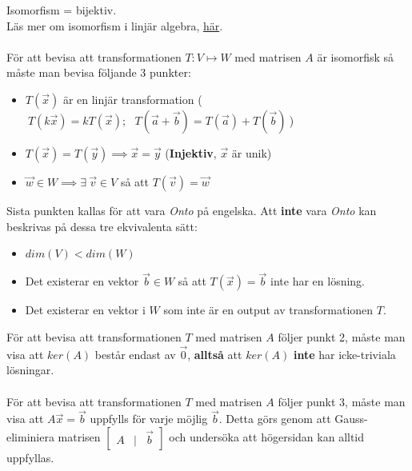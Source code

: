 \documentclass{report}
\begin{document}
{
	Isomorfism = bijektiv.\\
	Läs mer om isomorfism i linjär algebra, \href{https://math.libretexts.org/Bookshelves/Linear_Algebra/A_First_Course_in_Linear_Algebra_(Kuttler)/05\%3A_Linear_Transformations/5.06\%3A_Isomorphisms}{här}.
	\\\\
	
	För att bevisa att transformationen $T: V \mapsto W$ med matrisen $A$ är isomorfisk så måste man bevisa följande 3 punkter:
	\begin{itemize}
		\item $T(\vec{x})$ är en linjär transformation ($\:T(k\vec{x}) = kT(\vec{x}); \:\:\: T(\vec{a} + \vec{b}) = T(\vec{a}) + T(\vec{b})\:$)
		\item $T(\vec{x}) = T(\vec{y}) \implies \vec{x} = \vec{y}$ (\textbf{Injektiv}, $\vec{x}$ är unik)
		\item $\vec{w} \in W \implies \exists \: \vec{v} \in V$ så att $T(\vec{v}) = \vec{w}$
	\end{itemize}
	Sista punkten kallas för att vara \textit{Onto} på engelska. Att \textbf{inte} vara \textit{Onto} kan beskrivas på dessa tre ekvivalenta sätt:
	\begin{itemize}
		\item $dim(V) < dim(W)$
		\item Det existerar en vektor $\vec{b} \in W$ så att $T(\vec{x}) = \vec{b}$ inte har en lösning.
		\item Det existerar en vektor i $W$ som inte är en output av transformationen $T$. 
	\end{itemize}
	För att bevisa att transformationen $T$ med matrisen $A$ följer punkt 2, måste man visa att $ker(A)$ består endast av $\vec{0}$, \textbf{alltså} att $ker(A)$ \textbf{inte} har icke-triviala lösningar.\\\\
	
	För att bevisa att transformationen $T$ med matrisen $A$ följer punkt 3, måste man visa att $A\vec{x} = \vec{b}$ uppfylls för varje möjlig $\vec{b}$. Detta görs genom att Gauss-eliminiera matrisen $
\begin{bmatrix}
	A & | & \vec{b}
\end{bmatrix}	
$ och undersöka att högersidan kan alltid uppfyllas. 
}
\end{document}
